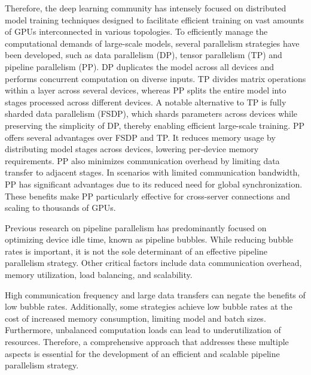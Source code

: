 \documentclass[sigplan,screen]{acmart}
\begin{document}
Therefore, the deep learning community has intensely focused on distributed model training techniques designed to facilitate efficient training on vast amounts of GPUs interconnected in various topologies. To efficiently manage the computational demands of large-scale models, several parallelism strategies have been developed, such as data parallelism (DP), tensor parallelism (TP) and pipeline parallelism (PP). DP duplicates the model across all devices and performs concurrent computation on diverse inputs. TP divides matrix operations within a layer across several devices, whereas PP splits the entire model into stages processed across different devices. A notable alternative to TP is fully sharded data parallelism (FSDP), which shards parameters across devices while preserving the simplicity of DP, thereby enabling efficient large-scale training. PP offers several advantages over FSDP and TP. It reduces memory usage by distributing model stages across devices, lowering per-device memory requirements. PP also minimizes communication overhead by limiting data transfer to adjacent stages. In scenarios with limited communication bandwidth, PP has significant advantages due to its reduced need for global synchronization. These benefits make PP particularly effective for cross-server connections and scaling to thousands of GPUs.

Previous research on pipeline parallelism has predominantly focused on optimizing device idle time, known as pipeline bubbles. While reducing bubble rates is important, it is not the sole determinant of an effective pipeline parallelism strategy. Other critical factors include data communication overhead, memory utilization, load balancing, and scalability. 


High communication frequency and large data transfers can negate the benefits of low bubble rates. Additionally, some strategies achieve low bubble rates at the cost of increased memory consumption, limiting model and batch sizes. Furthermore, unbalanced computation loads can lead to underutilization of resources. Therefore, a comprehensive approach that addresses these multiple aspects is essential for the development of an efficient and scalable pipeline parallelism strategy.
\end{document}
